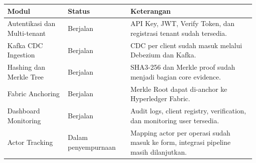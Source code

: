 \begin{longtable}{p{4.2cm}p{2.7cm}p{6.8cm}}
\toprule
\textbf{Modul} & \textbf{Status} & \textbf{Keterangan} \\
\midrule
Autentikasi dan Multi-tenant & Berjalan & API Key, JWT, Verify Token, dan registrasi tenant sudah tersedia. \\
\midrule
Kafka CDC Ingestion & Berjalan & CDC per client sudah masuk melalui Debezium dan Kafka. \\
\midrule
Hashing dan Merkle Tree & Berjalan & SHA3-256 dan Merkle proof sudah menjadi bagian core evidence. \\
\midrule
Fabric Anchoring & Berjalan & Merkle Root dapat di-anchor ke Hyperledger Fabric. \\
\midrule
Dashboard Monitoring & Berjalan & Audit logs, client registry, verification, dan monitoring user tersedia. \\
\midrule
Actor Tracking & Dalam penyempurnaan & Mapping actor per operasi sudah masuk ke form, integrasi pipeline masih dilanjutkan. \\
\bottomrule
\end{longtable}
